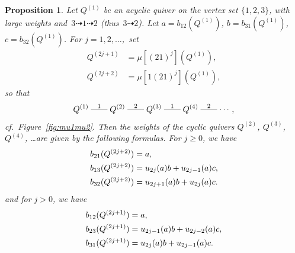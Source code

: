 \documentclass[11pt, letterpaper]{amsart}
\newtheorem{proposition}[theorem]{Proposition}
\theoremstyle{definition}
\numberwithin{equation}{section}
\newcommand{\T}[2]{\mu[#1](#2)} %
\newcommand{\mutation}[1]{\stackrel{#1}{\rule[.5ex]{2em}{0.5pt}}}
\newcommand{\points}{\!\dasharrow\!}
\begin{document}
\begin{proposition}
\label{pr:3VertexAlternatingMutations}
Let $Q^{(1)}$ be an acyclic quiver on the vertex set $\{1,2,3\}$, with large weights and~${3\points1\points2}$ (thus~${3\points2}$). 
Let $a\!=\! b_{12}(Q^{(1)})$, $b\!=\!b_{31}(Q^{(1)})$, $c\!=\!b_{32}(Q^{(1)})$. 
For $j=1,2,\dots$,~set
\begin{align*}
Q^{(2j+1)}&=\T{(2 1)^j}{Q^{(1)}}, \\
Q^{(2j+2)}&=\T{1(2 1)^j}{Q^{(1)}},
\end{align*}
so that
\begin{equation}
\label{eq:mu12121...}
Q^{(1)} \mutation{1} 
Q^{(2)} \mutation{2}
Q^{(3)} \mutation{1}
Q^{(4)} \mutation{2}
\cdots,
\end{equation}
cf.\ Figure~\ref{fig:mu1mu2}.
Then the weights of the cyclic quivers $Q^{(2)}$, $Q^{(3)}$, $Q^{(4)}$, \dots are given by the following formulas. 
For $j\ge0$, we have
\begin{align*}
b_{21}(Q^{(2j+2)}) &=  a,\\
b_{13}(Q^{(2j+2)}) &=  \h_{2j}(a)b + \h_{2j-1}(a)c,\\%
b_{32}(Q^{(2j+2)}) &=  \h_{2j+1}(a)b + \h_{2j}(a)c. 
\end{align*}
and for $j>0$, we have
\begin{align*} 
b_{12}(Q^{(2j+1)}) &=  a,\\
b_{23}(Q^{(2j+1)}) &=  u_{2j-1}(a)b + u_{2j-2}(a)c,\\
b_{31}(Q^{(2j+1)}) &=  u_{2j}(a)b + u_{2j-1}(a)c.\\
\end{align*}
\end{proposition} 
\end{document}
